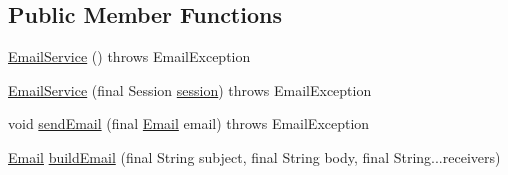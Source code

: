 \subsection*{Public Member Functions}
\begin{DoxyCompactItemize}
\item 
\hyperlink{classbr_1_1usp_1_1cata_1_1service_1_1_email_service_a47804eb90f58f22469b23aa82919361f}{Email\+Service} ()  throws Email\+Exception 
\item 
\hyperlink{classbr_1_1usp_1_1cata_1_1service_1_1_email_service_a6800014ed9f5ec5869d999fc580a623e}{Email\+Service} (final Session \hyperlink{classbr_1_1usp_1_1cata_1_1service_1_1_email_service_aaff5f980e96cf78a79aabe980bb9b11f}{session})  throws Email\+Exception 
\item 
void \hyperlink{classbr_1_1usp_1_1cata_1_1service_1_1_email_service_aea0165afd1266d5473cb47eb69f0a668}{send\+Email} (final \hyperlink{classbr_1_1usp_1_1cata_1_1model_1_1_email}{Email} email)  throws Email\+Exception 
\item 
\hyperlink{classbr_1_1usp_1_1cata_1_1model_1_1_email}{Email} \hyperlink{classbr_1_1usp_1_1cata_1_1service_1_1_email_service_a7f2806a58bf35075f50c4f9840749a4d}{build\+Email} (final String subject, final String body, final String...\+receivers)
\end{DoxyCompactItemize}
